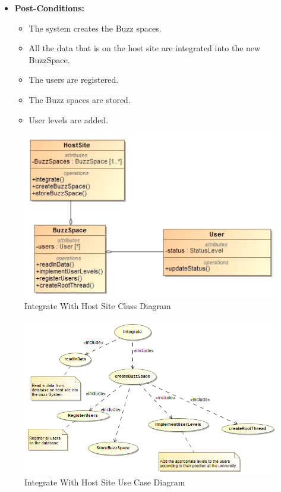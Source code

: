 \documentclass[11pt]{article}
\begin{document}
\begin{enumerate}
\begin{itemize}
\item\textbf{Post-Conditions: }
	\begin{itemize}
		\item The system creates the Buzz spaces.
		\item All the data that is on the host site are integrated into the new BuzzSpace.
		\item The users are registered.
		\item The Buzz spaces are stored.
		\item User levels are added.
	\end{itemize}
\end{itemize}
\graphicspath{ {../Diagrams/Maret/class/} }
	\begin{figure}[H]	
    	\includegraphics[scale=0.5]{Integrate.jpg}
    	\caption{Integrate With Host Site Class Diagram}
	\end{figure}
\graphicspath{ {../Diagrams/Maret/usecase/} }	
	\begin{figure}[H]	
    	\includegraphics[scale=0.5]{Integrate.png}
    	\caption{Integrate With Host Site Use Case Diagram}
	\end{figure}
	

\end{enumerate}
\end{document}
